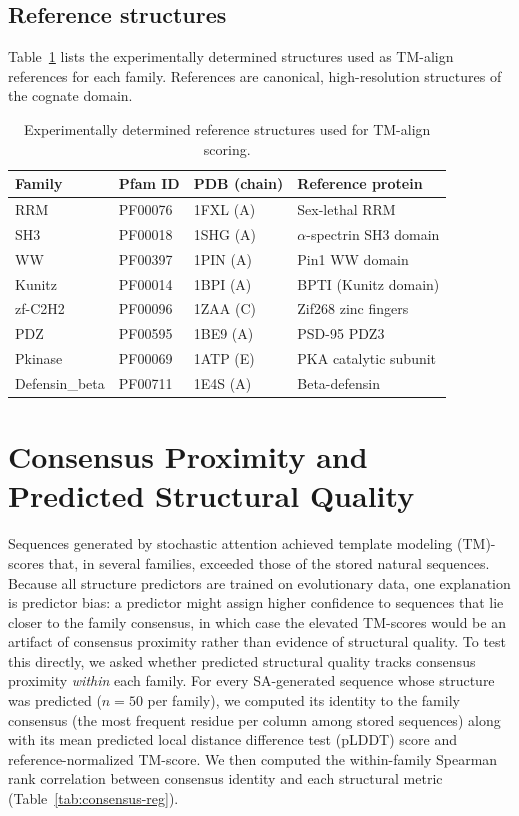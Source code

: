 \subsection*{Reference structures}
Table~\ref{tab:pdb-refs} lists the experimentally determined structures used as TM-align references for each family. References are canonical, high-resolution structures of the cognate domain.

\begin{table}[ht]
\centering
\caption{Experimentally determined reference structures used for TM-align scoring.}
\label{tab:pdb-refs}
\small
\begin{tabular}{@{}llll@{}}
\toprule
Family & Pfam ID & PDB (chain) & Reference protein \\
\midrule
RRM            & PF00076 & 1FXL (A) & Sex-lethal RRM \\
SH3            & PF00018 & 1SHG (A) & $\alpha$-spectrin SH3 domain \\
WW             & PF00397 & 1PIN (A) & Pin1 WW domain \\
Kunitz         & PF00014 & 1BPI (A) & BPTI (Kunitz domain) \\
zf-C2H2        & PF00096 & 1ZAA (C) & Zif268 zinc fingers \\
PDZ            & PF00595 & 1BE9 (A) & PSD-95 PDZ3 \\
Pkinase        & PF00069 & 1ATP (E) & PKA catalytic subunit \\
Defensin\_beta & PF00711 & 1E4S (A) & Beta-defensin \\
\bottomrule
\end{tabular}
\end{table}

\section{Consensus Proximity and Predicted Structural Quality}\label{si:consensus-reg}

Sequences generated by stochastic attention achieved template modeling (TM)-scores that, in several families, exceeded those of the stored natural sequences. Because all structure predictors are trained on evolutionary data, one explanation is predictor bias: a predictor might assign higher confidence to sequences that lie closer to the family consensus, in which case the elevated TM-scores would be an artifact of consensus proximity rather than evidence of structural quality. To test this directly, we asked whether predicted structural quality tracks consensus proximity \emph{within} each family. For every SA-generated sequence whose structure was predicted ($n{=}50$ per family), we computed its identity to the family consensus (the most frequent residue per column among stored sequences) along with its mean predicted local distance difference test (pLDDT) score and reference-normalized TM-score. We then computed the within-family Spearman rank correlation between consensus identity and each structural metric (Table~\ref{tab:consensus-reg}).

